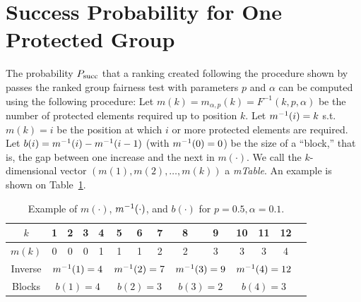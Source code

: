 \section{Success Probability for One Protected Group}\label{subsubsec:adjustment-binomial}

The probability $P_{\operatorname{succ}}$ that a ranking created following the procedure shown by~\citet{yang2016measuring} passes the ranked group fairness test with parameters $p$ and $\alpha$ can be computed using the following procedure:
%
Let $m(k) = m_{\alpha,p}(k) = F^{-1}(k,p,\alpha)$ be the number of protected elements required up to position $k$.
%
Let $m^{-1}(i) = k$ s.t. $m(k) = i$ be the position at which $i$ or more protected elements are required.
%
Let $b(i) = m^{-1}(i) - m^{-1}(i-1)$ (with $m^{-1}(0) = 0$) be the size of a ``block,'' that is, the gap between one increase and the next in $m(\cdot)$.
%
We call the $k$-dimensional vector $(m(1), m(2), \ldots , m(k))$ a \emph{mTable}.
%
An example is shown on Table~\ref{tbl:05:example_blocks}.
%
\begin{table}[h!]
	\centering
	\begin{tabular}{cccccccccccccc}\toprule
		$k$    & 1 & 2 & 3 & \textbf{{4}} & 5 & 6 & \textbf{7} & 8 & \textbf{9} & 10 & 11 & \textbf{12} \\
		\midrule
		$m(k)$ & 0 & 0 & 0 & \multicolumn{1}{c|}{1} & 1 & 1 & \multicolumn{1}{c|}{2} & 2 & \multicolumn{1}{c|}{3} & 3  & 3  & \multicolumn{1}{c}{4}\\
		Inverse   & \multicolumn{4}{c|}{$m^{-1}(1)=4$}
		& \multicolumn{3}{c|}{$m^{-1}(2)=7$}
		& \multicolumn{2}{c|}{$m^{-1}(3)=9$}
		& \multicolumn{3}{c}{$m^{-1}(4)=12$}\\
		Blocks       & \multicolumn{4}{c|}{$b(1)=4$}
		& \multicolumn{3}{c|}{$b(2)=3$}
		& \multicolumn{2}{c|}{$b(3)=2$}
		& \multicolumn{3}{c}{$b(4)=3$}\\
		\bottomrule
	\end{tabular}
	\caption[Example of different block sizes]{Example of $m(\cdot)$, $m^{-1}(\cdot)$, and $b(\cdot)$ for $p=0.5, \alpha=0.1$.}
	\label{tbl:05:example_blocks}
\end{table}

